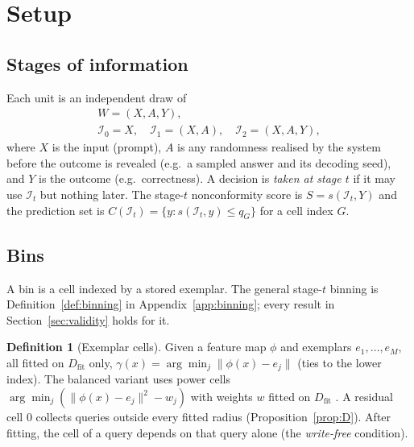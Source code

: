 \documentclass[twoside]{article}
\theoremstyle{definition}
\newtheorem{definition}[theorem]{Definition}
\theoremstyle{remark}
\newcommand{\Dfit}{D_{\mathrm{fit}}}
\newcommand{\Info}{\mathcal{I}}
\newcommand{\1}{\mathbf{1}}
\begin{document}

\section{Setup}
\label{sec:setup}

\subsection{Stages of information}
Each unit is an independent draw of
\begin{gather*}
  W = (X, A, Y),\\
  \Info_0 = X,\quad \Info_1 = (X, A),\quad \Info_2 = (X, A, Y),
\end{gather*}
where $X$ is the input (prompt), $A$ is any randomness realised by the system
before the outcome is revealed (e.g.\ a sampled answer and its decoding seed),
and $Y$ is the outcome (e.g.\ correctness). A decision is \emph{taken at stage
$t$} if it may use $\Info_t$ but nothing later. The stage-$t$ nonconformity score
is $S = s(\Info_t, Y)$ and the prediction set is
$C(\Info_t) = \{y: s(\Info_t, y) \le q_{G}\}$ for a cell index $G$.

\subsection{Bins}
A bin is a cell indexed by a stored exemplar. The general
stage-$t$ binning is Definition~\ref{def:binning} in Appendix~\ref{app:binning}; every
result in Section~\ref{sec:validity} holds for it.

\begin{definition}[Exemplar cells]
\label{def:exemplar}
Given a feature map $\phi$ and exemplars $e_1,\dots,e_M$, all fitted on $\Dfit$ only,
$\gamma(x)=\arg\min_j \|\phi(x)-e_j\|$ (ties to the lower index). The balanced variant uses
power cells $\arg\min_j(\|\phi(x)-e_j\|^2-w_j)$ with weights $w$ fitted on $\Dfit$
. A residual cell $0$ collects queries outside every fitted radius
(Proposition~\ref{prop:D}). After fitting, the cell of a query depends on that query
alone (the \emph{write-free} condition).
\end{definition}
\end{document}
